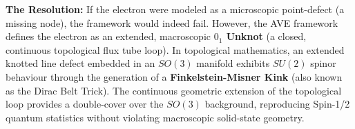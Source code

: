 \textbf{The Resolution:} If the electron were modeled as a microscopic point-defect (a missing node), the framework would indeed fail. However, the AVE framework defines the electron as an extended, macroscopic \textbf{$0_1$ Unknot} (a closed, continuous topological flux tube loop). In topological mathematics, an extended knotted line defect embedded in an $SO(3)$ manifold exhibits $SU(2)$ spinor behaviour through the generation of a \textbf{Finkelstein-Misner Kink} (also known as the Dirac Belt Trick). The continuous geometric extension of the topological loop provides a double-cover over the $SO(3)$ background, reproducing Spin-1/2 quantum statistics without violating macroscopic solid-state geometry.

